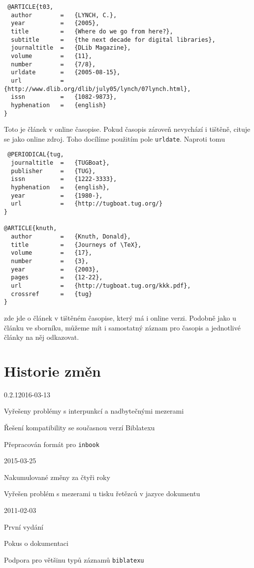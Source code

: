 \documentclass[a4paper,10pt]{ltxdockit}
\def\t|#1|{\texttt{#1}}
\def\c#1{%
\hangpara{3em}{1}%
\fullcite{#1}}
\begin{document}
 \c{t03}
 \begin{verbatim}
 @ARTICLE{t03,
  author        =   {LYNCH, C.},
  year          =   {2005},
  title         =   {Where do we go from here?},
  subtitle      =   {the next decade for digital libraries},
  journaltitle  =   {DLib Magazine},
  volume        =   {11},
  number        =   {7/8},
  urldate       =   {2005-08-15},
  url           =   {http://www.dlib.org/dlib/july05/lynch/07lynch.html}, 
  issn          =   {1082-9873},
  hyphenation   =   {english} 
}
 \end{verbatim}
 
\noindent Toto je článek v online časopise. Pokud časopis zároveň nevychází i tištěně, cituje se jako online zdroj. Toho docílíme použitím pole \t|urldate|. Naproti tomu 
 
 \c{knuth}
 \begin{verbatim}
 @PERIODICAL{tug,
  journaltitle  =   {TUGBoat},
  publisher     =   {TUG},
  issn          =   {1222-3333},
  hyphenation   =   {english},
  year          =   {1980-},
  url           =   {http://tugboat.tug.org/}
}

@ARTICLE{knuth,
  author        =   {Knuth, Donald},
  title         =   {Journeys of \TeX},
  volume        =   {17},
  number        =   {3},
  year          =   {2003},
  pages         =   {12-22},
  url           =   {http://tugboat.tug.org/kkk.pdf},
  crossref      =   {tug}
}
 \end{verbatim}
 
\noindent zde jde o článek v tištěném časopise, který má i online verzi. Podobně jako u článku ve sborníku, můžeme mít i samostatný záznam pro časopis a jednotlivé články na něj odkazovat.
\nocite{*}
\printbibliography[title={Ukázková bibliografie},heading={bibnumbered}]


\section{Historie změn}
\begin{changelog}
\begin{release}{0.2.1}{2016-03-13}
\item Vyřešeny problémy s interpunkcí a nadbytečnými mezerami
\item Řešení kompatibility se současnou verzí Biblatexu
\item Přepracován formát pro \verb|inbook|
\end{release}
\begin{release}{0.2}{2015-03-25}
\item Nakumulované změny za čtyři roky
\item Vyřešen problém s mezerami u tisku řetězců v jazyce dokumentu
\end{release}
\begin{release}{0.1}{2011-02-03}
\item První vydání
\item Pokus o dokumentaci
\item Podpora pro většinu typů záznamů \t|biblatexu|
\end{release}
\end{changelog}
\end{document}

